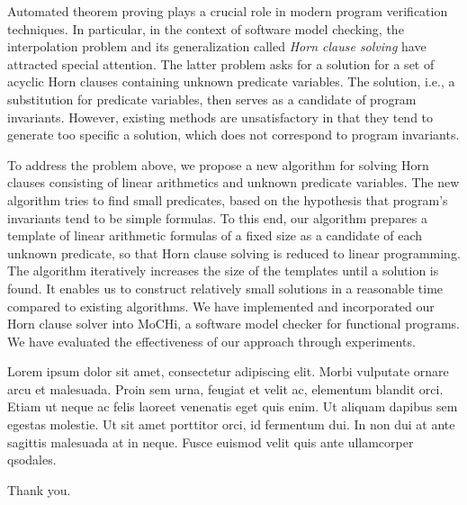 \documentclass[master,final,12pt]{iscs-thesis}
\date{August 28, 2013}
\begin{document}
\begin{eabstract}
Automated theorem proving plays a crucial role in modern program
verification techniques.  In particular, in the context of software
model checking, the interpolation problem and its generalization
called \emph{Horn clause solving} have attracted special attention.
The latter problem asks for a solution for a set of acyclic Horn
clauses containing unknown predicate variables.  The solution, i.e., a
substitution for predicate variables, then serves as a candidate of
program invariants.  However, existing methods are unsatisfactory in
that they tend to generate too specific a solution, which does not
correspond to program invariants.

To address the problem above, we propose a new algorithm for solving
Horn clauses consisting of linear arithmetics and unknown predicate
variables.  The new algorithm tries to find small predicates, based on
the hypothesis that program's invariants tend to be simple formulas.
To this end, our algorithm prepares a template of linear arithmetic
formulas of a fixed size as a candidate of each unknown predicate, so
that Horn clause solving is reduced to linear programming.  The
algorithm iteratively increases the size of the templates until a
solution is found.  It enables us to construct relatively small
solutions in a reasonable time compared to existing algorithms.  We
have implemented and incorporated our Horn clause solver into MoCHi, a
software model checker for functional programs.  We have evaluated the
effectiveness of our approach through experiments.
\end{eabstract}
\begin{jabstract}
Lorem ipsum dolor sit amet, consectetur adipiscing elit.  Morbi
vulputate ornare arcu et malesuada.  Proin sem urna, feugiat et velit
ac, elementum blandit orci.  Etiam ut neque ac felis laoreet venenatis
eget quis enim.  Ut aliquam dapibus sem egestas molestie.  Ut sit amet
porttitor orci, id fermentum dui.  In non dui at ante sagittis
malesuada at in neque.  Fusce euismod velit quis ante ullamcorper
qsodales.
\end{jabstract}
\maketitle

\begin{acknowledge}
Thank you.
\end{acknowledge}

\frontmatter
\tableofcontents
\end{document}
